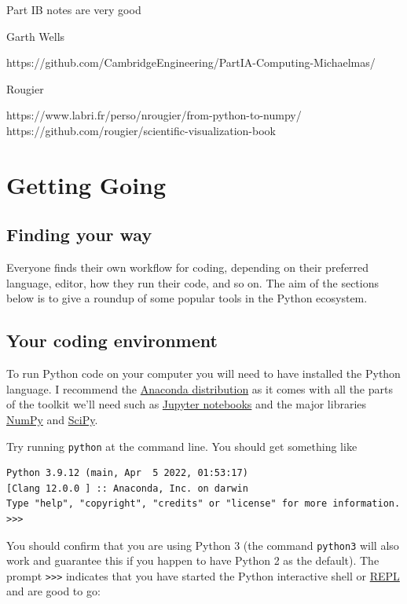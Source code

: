 \documentclass[
  letterpaper,
  DIV=11,
  numbers=noendperiod]{scrreprt}
\theoremstyle{definition}
\theoremstyle{remark}
\begin{document}
Part IB notes are very good

Garth Wells

https://github.com/CambridgeEngineering/PartIA-Computing-Michaelmas/

Rougier

https://www.labri.fr/perso/nrougier/from-python-to-numpy/
https://github.com/rougier/scientific-visualization-book


\hypertarget{getting-going}{%
\chapter{Getting Going}\label{getting-going}}

\hypertarget{finding-your-way}{%
\section{Finding your way}\label{finding-your-way}}

Everyone finds their own workflow for coding, depending on their
preferred language, editor, how they run their code, and so on. The aim
of the sections below is to give a roundup of some popular tools in the
Python ecosystem.

\hypertarget{your-coding-environment}{%
\section{Your coding environment}\label{your-coding-environment}}

To run Python code on your computer you will need to have installed the
Python language. I recommend the
\href{https://www.anaconda.com/products/distribution}{Anaconda
distribution} as it comes with all the parts of the toolkit we'll need
such as \href{https://jupyter.org/}{Jupyter notebooks} and the major
libraries \href{https://numpy.org/}{NumPy} and
\href{https://scipy.org/}{SciPy}.

Try running \texttt{python} at the command line. You should get
something like

\begin{verbatim}
Python 3.9.12 (main, Apr  5 2022, 01:53:17) 
[Clang 12.0.0 ] :: Anaconda, Inc. on darwin
Type "help", "copyright", "credits" or "license" for more information.
>>> 
\end{verbatim}

You should confirm that you are using Python 3 (the command
\texttt{python3} will also work and guarantee this if you happen to have
Python 2 as the default). The prompt
\texttt{\textgreater{}\textgreater{}\textgreater{}} indicates that you
have started the Python interactive shell or
\href{https://en.wikipedia.org/wiki/Read\%E2\%80\%93eval\%E2\%80\%93print_loop}{REPL}
and are good to go:
\end{document}
